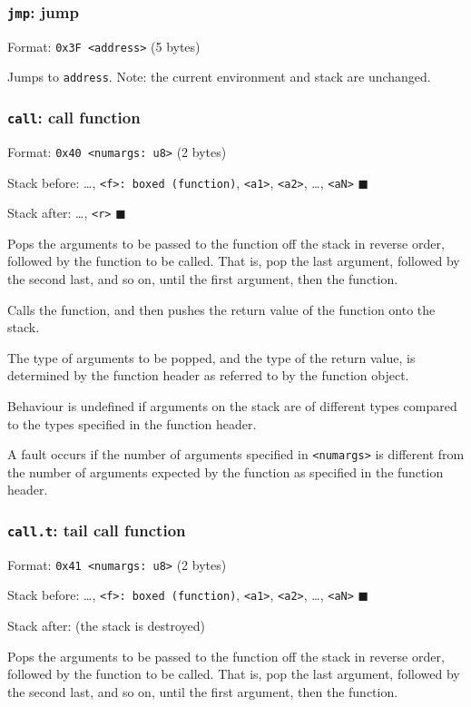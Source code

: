 \subsubsection{\texttt{jmp}: jump}
\label{sec:orgeb956da}
Format: \texttt{0x3F <address>} (5 bytes)

Jumps to \texttt{address}. Note: the current environment and stack are
unchanged.

\subsubsection{\texttt{call}: call function}
\label{sec:orgc60978b}
Format: \texttt{0x40 <numargs: u8>} (2 bytes)

Stack before: \ldots{}, \texttt{<f>: boxed (function)}, \texttt{<a1>}, \texttt{<a2>}, \ldots{},
\texttt{<aN>} \(\blacksquare\)

Stack after: \ldots{}, \texttt{<r>} \(\blacksquare\)

Pops the arguments to be passed to the function off the stack in reverse
order, followed by the function to be called. That is, pop the last
argument, followed by the second last, and so on, until the first
argument, then the function.

Calls the function, and then pushes the return value of the function
onto the stack.

The type of arguments to be popped, and the type of the return value, is
determined by the function header as referred to by the function object.

Behaviour is undefined if arguments on the stack are of different types
compared to the types specified in the function header.

A fault occurs if the number of arguments specified in \texttt{<numargs>} is
different from the number of arguments expected by the function as
specified in the function header.

\subsubsection{\texttt{call.t}: tail call function}
\label{sec:org026b562}
Format: \texttt{0x41 <numargs: u8>} (2 bytes)

Stack before: \ldots{}, \texttt{<f>: boxed (function)}, \texttt{<a1>}, \texttt{<a2>}, \ldots{},
\texttt{<aN>} \(\blacksquare\)

Stack after: (the stack is destroyed)

Pops the arguments to be passed to the function off the stack in reverse
order, followed by the function to be called. That is, pop the last
argument, followed by the second last, and so on, until the first
argument, then the function.

